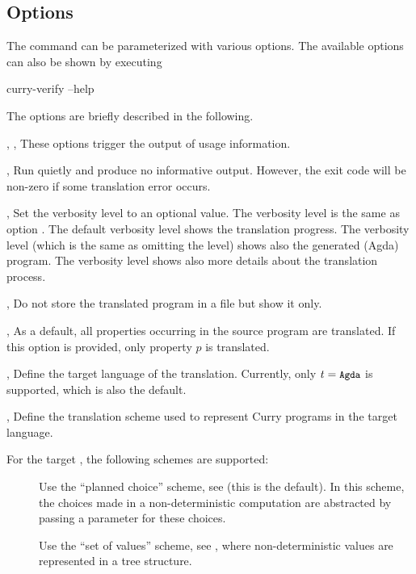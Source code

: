 \subsection{Options}

The command  can be parameterized
with various options.
The available options can also be shown by executing
\begin{curry}
curry-verify --help
\end{curry}
The options are briefly described in the following.

\begin{description}
\item{, , }
These options trigger the output of usage information.

\item{, }
Run quietly and produce no informative output.
However, the exit code will be non-zero if some translation error occurs.

\item{, }
Set the verbosity level to an optional value.
The verbosity level  is the same as option .
The default verbosity level  shows the translation progress.
The verbosity level  (which is the same as omitting the level)
shows also the generated (Agda) program.
The verbosity level  shows also more details about
the translation process.

\item{, }
Do not store the translated program in a file but show it only.

\item{, }
As a default, all properties occurring in the source program are
translated. If this option is provided, only property $p$ is translated.

\item{, }
Define the target language of the translation.
Currently, only $t = \code{Agda}$ is supported, which is also the
default.

\item{, }
Define the translation scheme used to represent Curry programs
in the target language.

For the target , the following schemes are supported:
\begin{description}
\item[]
Use the ``planned choice'' scheme, see \cite{AntoyHanusLibby17EPTCS}
(this is the default).
In this scheme, the choices made in a non-deterministic computation
are abstracted by passing a parameter for these choices.
\item[]
Use the ``set of values'' scheme, see \cite{AntoyHanusLibby17EPTCS},
where non-deterministic values are represented in a tree structure.
\end{description}

\end{description}

